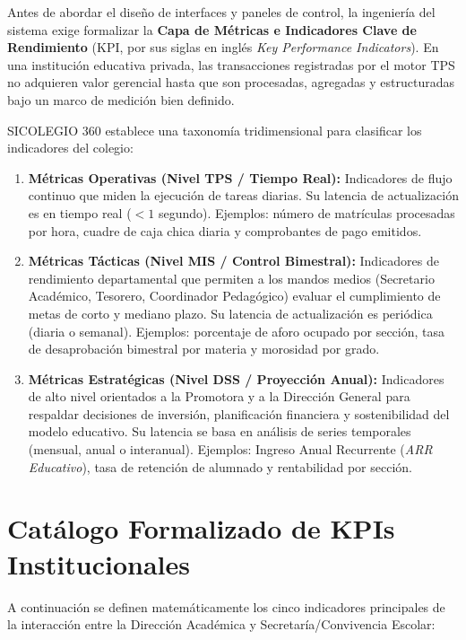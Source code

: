 \documentclass[12pt,a4paper,oneside]{report}
\begin{document}
    Antes de abordar el diseño de interfaces y paneles de control, la ingeniería del sistema exige formalizar la \textbf{Capa de Métricas e Indicadores Clave de Rendimiento} (KPI, por sus siglas en inglés \textit{Key Performance Indicators}). En una institución educativa privada, las transacciones registradas por el motor TPS no adquieren valor gerencial hasta que son procesadas, agregadas y estructuradas bajo un marco de medición bien definido.

    SICOLEGIO 360 establece una taxonomía tridimensional para clasificar los indicadores del colegio:

    \begin{enumerate}
        \item \textbf{Métricas Operativas (Nivel TPS / Tiempo Real):} Indicadores de flujo continuo que miden la ejecución de tareas diarias. Su latencia de actualización es en tiempo real ($<1$ segundo). Ejemplos: número de matrículas procesadas por hora, cuadre de caja chica diaria y comprobantes de pago emitidos.
        \item \textbf{Métricas Tácticas (Nivel MIS / Control Bimestral):} Indicadores de rendimiento departamental que permiten a los mandos medios (Secretario Académico, Tesorero, Coordinador Pedagógico) evaluar el cumplimiento de metas de corto y mediano plazo. Su latencia de actualización es periódica (diaria o semanal). Ejemplos: porcentaje de aforo ocupado por sección, tasa de desaprobación bimestral por materia y morosidad por grado.
        \item \textbf{Métricas Estratégicas (Nivel DSS / Proyección Anual):} Indicadores de alto nivel orientados a la Promotora y a la Dirección General para respaldar decisiones de inversión, planificación financiera y sostenibilidad del modelo educativo. Su latencia se basa en análisis de series temporales (mensual, anual o interanual). Ejemplos: Ingreso Anual Recurrente (\textit{ARR Educativo}), tasa de retención de alumnado y rentabilidad por sección.
    \end{enumerate}

    \section{Catálogo Formalizado de KPIs Institucionales}

    A continuación se definen matemáticamente los cinco indicadores principales de la interacción entre la Dirección Académica y Secretaría/Convivencia Escolar:
\end{document}
